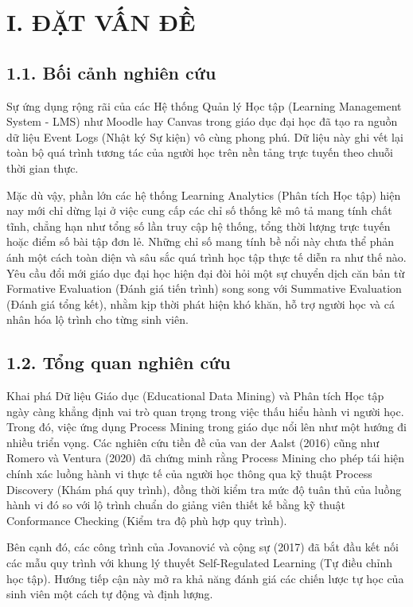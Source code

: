 \section{I. ĐẶT VẤN ĐỀ}

\subsection{1.1. Bối cảnh nghiên cứu}
Sự ứng dụng rộng rãi của các Hệ thống Quản lý Học tập (Learning Management System - LMS) như Moodle hay Canvas trong giáo dục đại học đã tạo ra nguồn dữ liệu Event Logs (Nhật ký Sự kiện) vô cùng phong phú. Dữ liệu này ghi vết lại toàn bộ quá trình tương tác của người học trên nền tảng trực tuyến theo chuỗi thời gian thực.

Mặc dù vậy, phần lớn các hệ thống Learning Analytics (Phân tích Học tập) hiện nay mới chỉ dừng lại ở việc cung cấp các chỉ số thống kê mô tả mang tính chất tĩnh, chẳng hạn như tổng số lần truy cập hệ thống, tổng thời lượng trực tuyến hoặc điểm số bài tập đơn lẻ. Những chỉ số mang tính bề nổi này chưa thể phản ánh một cách toàn diện và sâu sắc quá trình học tập thực tế diễn ra như thế nào. Yêu cầu đổi mới giáo dục đại học hiện đại đòi hỏi một sự chuyển dịch căn bản từ Formative Evaluation (Đánh giá tiến trình) song song với Summative Evaluation (Đánh giá tổng kết), nhằm kịp thời phát hiện khó khăn, hỗ trợ người học và cá nhân hóa lộ trình cho từng sinh viên.

\subsection{1.2. Tổng quan nghiên cứu}
Khai phá Dữ liệu Giáo dục (Educational Data Mining) và Phân tích Học tập ngày càng khẳng định vai trò quan trọng trong việc thấu hiểu hành vi người học. Trong đó, việc ứng dụng Process Mining trong giáo dục nổi lên như một hướng đi nhiều triển vọng. Các nghiên cứu tiền đề của van der Aalst (2016) cũng như Romero và Ventura (2020) đã chứng minh rằng Process Mining cho phép tái hiện chính xác luồng hành vi thực tế của người học thông qua kỹ thuật Process Discovery (Khám phá quy trình), đồng thời kiểm tra mức độ tuân thủ của luồng hành vi đó so với lộ trình chuẩn do giảng viên thiết kế bằng kỹ thuật Conformance Checking (Kiểm tra độ phù hợp quy trình).

Bên cạnh đó, các công trình của Jovanović và cộng sự (2017) đã bắt đầu kết nối các mẫu quy trình với khung lý thuyết Self-Regulated Learning (Tự điều chỉnh học tập). Hướng tiếp cận này mở ra khả năng đánh giá các chiến lược tự học của sinh viên một cách tự động và định lượng.


